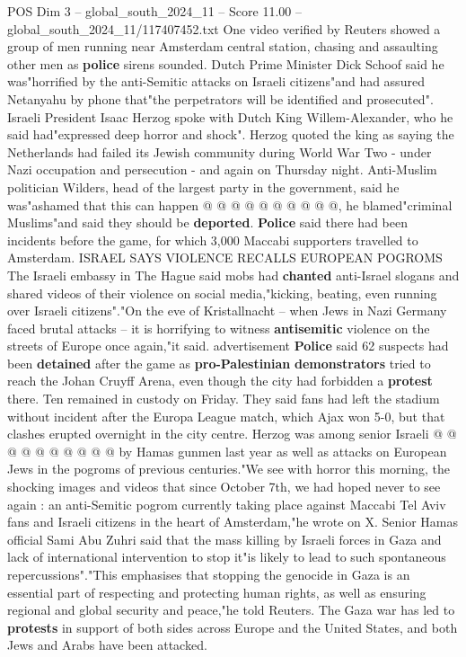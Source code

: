 \begin{textsample}{POS Dim 3 – global\_south\_2024\_11 – Score 11.00 – global\_south\_2024\_11/117407452.txt}
One video verified by Reuters showed a group of men running near Amsterdam central station, chasing and assaulting other men as \textbf{police} sirens sounded.
Dutch Prime Minister Dick Schoof said he was"horrified by the anti-Semitic attacks on Israeli citizens"and had assured Netanyahu by phone that"the perpetrators will be identified and prosecuted".
Israeli President Isaac Herzog spoke with Dutch King Willem-Alexander, who he said had"expressed deep horror and shock".
Herzog quoted the king as saying the Netherlands had failed its Jewish community during World War Two - under Nazi occupation and persecution - and again on Thursday night.
Anti-Muslim politician Wilders, head of the largest party in the government, said he was"ashamed that this can happen @ @ @ @ @ @ @ @ @ @, he blamed"criminal Muslims"and said they should be \textbf{deported}. \textbf{Police} said there had been incidents before the game, for which 3,000 Maccabi supporters travelled to Amsterdam.
ISRAEL SAYS VIOLENCE RECALLS EUROPEAN POGROMS The Israeli embassy in The Hague said mobs had \textbf{chanted} anti-Israel slogans and shared videos of their violence on social media,"kicking, beating, even running over Israeli citizens"."On the eve of Kristallnacht -- when Jews in Nazi Germany faced brutal attacks -- it is horrifying to witness \textbf{antisemitic} violence on the streets of Europe once again,"it said. advertisement \textbf{Police} said 62 suspects had been \textbf{detained} after the game as \textbf{pro-Palestinian} \textbf{demonstrators} tried to reach the Johan Cruyff Arena, even though the city had forbidden a \textbf{protest} there.
Ten remained in custody on Friday.
They said fans had left the stadium without incident after the Europa League match, which Ajax won 5-0, but that clashes erupted overnight in the city centre.
Herzog was among senior Israeli @ @ @ @ @ @ @ @ @ @ by Hamas gunmen last year as well as attacks on European Jews in the pogroms of previous centuries."We see with horror this morning, the shocking images and videos that since October 7th, we had hoped never to see again : an anti-Semitic pogrom currently taking place against Maccabi Tel Aviv fans and Israeli citizens in the heart of Amsterdam,"he wrote on X.
Senior Hamas official Sami Abu Zuhri said that the mass killing by Israeli forces in Gaza and lack of international intervention to stop it"is likely to lead to such spontaneous repercussions"."This emphasises that stopping the genocide in Gaza is an essential part of respecting and protecting human rights, as well as ensuring regional and global security and peace,"he told Reuters.
The Gaza war has led to \textbf{protests} in support of both sides across Europe and the United States, and both Jews and Arabs have been attacked.

\end{textsample}
